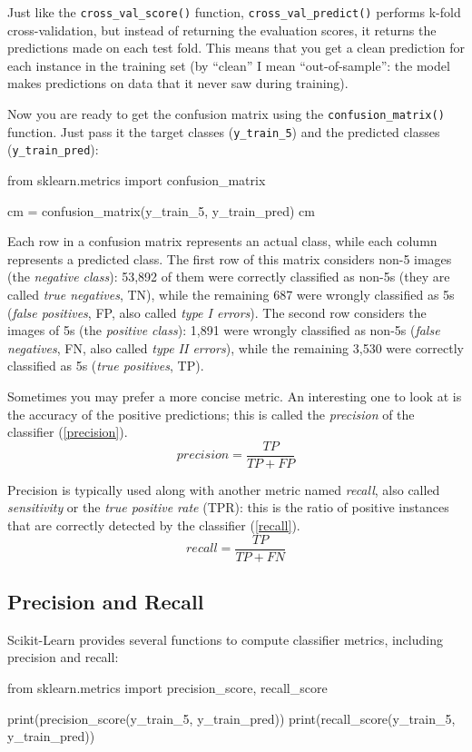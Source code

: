 Just like the \verb|cross_val_score()| function, \verb|cross_val_predict()| performs k-fold cross-validation, but instead of returning the evaluation scores, it returns the predictions made on each test fold. This means that you get a clean prediction for each instance in the training set (by ``clean” I mean ``out-of-sample”: the model makes predictions on data that it never saw during training).

Now you are ready to get the confusion matrix using the \verb|confusion_matrix()| function. Just pass it the target classes (\verb|y_train_5|) and the predicted classes
(\verb|y_train_pred|):
\begin{pyc}
    from sklearn.metrics import confusion_matrix

    cm = confusion_matrix(y_train_5, y_train_pred)
    cm
\end{pyc}
Each row in a confusion matrix represents an actual class, while each column represents a predicted class. The first row of this matrix considers non-5 images (the \emph{negative class}): 53,892 of them were correctly classified as non-5s (they are called \emph{true negatives}, TN), while the remaining 687 were wrongly classified as 5s (\emph{false positives}, FP, also called \emph{type I errors}). The second row considers the images of 5s (the \emph{positive class}): 1,891 were wrongly classified as non-5s (\emph{false negatives}, FN, also called \emph{type II errors}), while the remaining 3,530 were correctly classified as 5s (\emph{true positives}, TP).

Sometimes you may prefer a more concise metric. An interesting one to look at is the accuracy of the positive predictions; this is called the \emph{precision} of the classifier (\autoref{precision}).
\begin{equation}\label{precision}
    precision = \frac{TP}{TP+FP}
\end{equation}

Precision is typically used along with another metric named \emph{recall}, also called \emph{sensitivity} or the \emph{true positive rate} (TPR): this is the ratio of positive instances that are correctly detected by the classifier (\autoref{recall}).
\begin{equation}\label{recall}
    recall = \frac{TP}{TP+FN}
\end{equation}
\subsection{Precision and Recall}
Scikit-Learn provides several functions to compute classifier metrics, including precision and recall:
\begin{pyc}
    from sklearn.metrics import precision_score, recall_score

    print(precision_score(y_train_5, y_train_pred))
    print(recall_score(y_train_5, y_train_pred))
\end{pyc}

